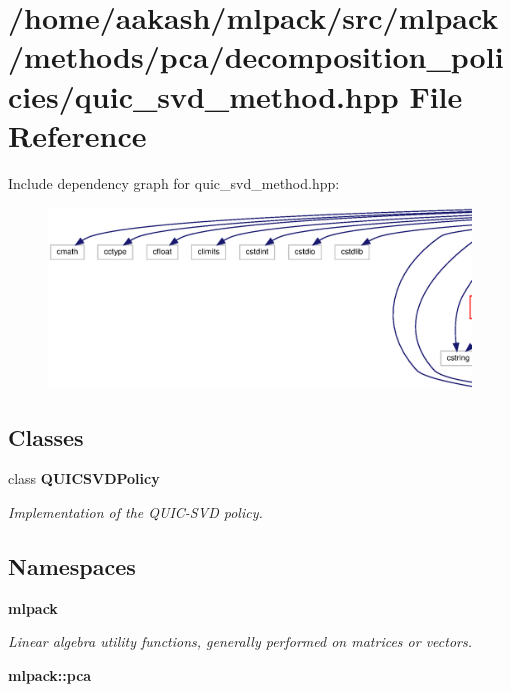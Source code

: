 \section{/home/aakash/mlpack/src/mlpack/methods/pca/decomposition\+\_\+policies/quic\+\_\+svd\+\_\+method.hpp File Reference}
\label{quic__svd__method_8hpp}
Include dependency graph for quic\+\_\+svd\+\_\+method.\+hpp\+:
\nopagebreak
\begin{figure}[H]
\begin{center}
\leavevmode
\includegraphics[width=350pt]{quic__svd__method_8hpp__incl}
\end{center}
\end{figure}
\subsection*{Classes}
\begin{DoxyCompactItemize}
\item 
class \textbf{ Q\+U\+I\+C\+S\+V\+D\+Policy}
\begin{DoxyCompactList}\small\item\em Implementation of the Q\+U\+I\+C-\/\+S\+VD policy. \end{DoxyCompactList}\end{DoxyCompactItemize}
\subsection*{Namespaces}
\begin{DoxyCompactItemize}
\item 
 \textbf{ mlpack}
\begin{DoxyCompactList}\small\item\em Linear algebra utility functions, generally performed on matrices or vectors. \end{DoxyCompactList}\item 
 \textbf{ mlpack\+::pca}
\end{DoxyCompactItemize}


